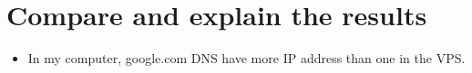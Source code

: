 \documentclass[paper=a4, fontsize=11pt]{scrartcl}
\numberwithin{equation}{section}		%
\numberwithin{figure}{section}			%
\numberwithin{table}{section}				%
\begin{document}
\section{Compare and explain the results}
\begin{itemize}
 \item In my computer, google.com DNS have more IP address than one in the VPS.
\end{itemize}
\end{document}
